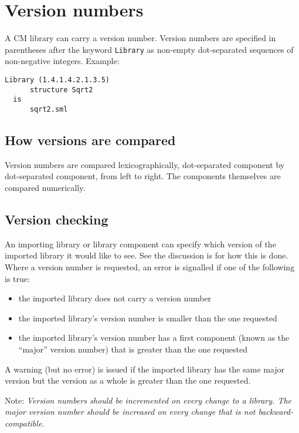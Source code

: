 %

\chapter{Version numbers}
\label{chap:versions}

A CM library can carry a version number.  Version numbers are
specified in parentheses after the keyword {\tt Library} as non-empty
dot-separated sequences of non-negative integers.  Example:

\begin{lstlisting}[language=CM]
  Library (1.4.1.4.2.1.3.5)
      structure Sqrt2
  is
      sqrt2.sml
\end{lstlisting}%

\section{How versions are compared}

Version numbers are compared lexicographically, dot-separated
component by dot-separated component, from left to right.  The
components themselves are compared numerically.

\section{Version checking}

An importing library or library component can specify which version of
the imported library it would like to see.  See the discussion is
 for how this is done.  Where a version
number is requested, an error is signalled if one of the following is
true:

\begin{itemize}
\item the imported library does not carry a version number
\item the imported library's version number is smaller than the
one requested
\item the imported library's version number has a first component
(known as the ``major'' version number) that is greater than the one
requested
\end{itemize}

A warning (but no error) is issued if the imported library has the
same major version but the version as a whole is greater than the one
requested.

Note: {\it Version numbers should be incremented on every change to a
library.  The major version number should be increased on every change
that is not backward-compatible.}
